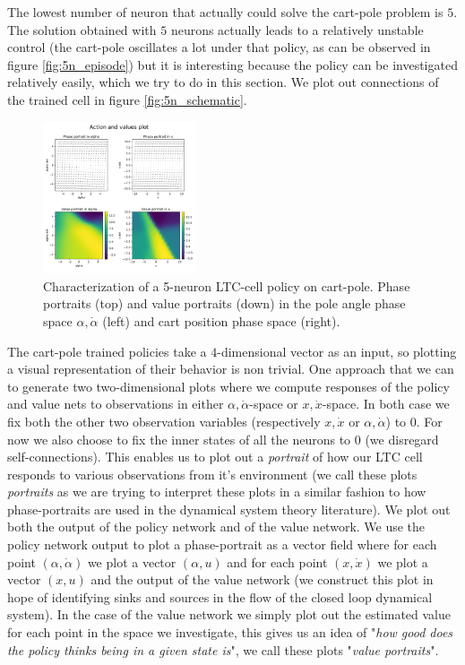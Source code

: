 The lowest number of neuron that actually could solve the cart-pole problem is $5$. The solution obtained with $5$ neurons actually leads to a relatively unstable control (the cart-pole oscillates a lot under that policy, as can be observed in figure \ref{fig:5n_episode}) but it is interesting because the policy can be investigated relatively easily, which we try to do in this section.  We plot out connections of the trained cell in figure \ref{fig:5n_schematic}.\\

\begin{figure}[h!]
    \centering
    \includegraphics[width=0.4\textwidth]{figures/5n_portrait.pdf}
    \caption{Characterization of a 5-neuron LTC-cell policy on cart-pole. Phase portraits (top) and value portraits (down) in the pole angle phase space $\alpha,\dot{\alpha}$ (left) and cart position phase space (right).}
    \label{fig:5n_portrait}
\end{figure}

The cart-pole trained policies take a $4$-dimensional vector as an input, so plotting a visual representation of their behavior is non trivial. One approach that we can to generate two two-dimensional plots where we compute responses of the policy and value nets to observations in either $\alpha,\dot{\alpha}$-space or $x,\dot{x}$-space. 
In both case we fix both the other two observation variables (respectively $x,\dot{x}$ or $\alpha,\dot{\alpha}$) to $0$. For now we also choose to fix the inner states of all the neurons to $0$ (we disregard self-connections). 
This enables us to plot out a \textit{portrait} of how our LTC cell responds to various observations from it's environment (we call these plots \textit{portraits} as we are trying to interpret these plots in a similar fashion to how phase-portraits are used in the dynamical system theory literature). We plot out both the output of the policy network and of the value network. We use the policy network output to plot a phase-portrait as a vector field where for each point $(\alpha,\dot{\alpha})$ we plot a vector $(\alpha,u)$ and for each point $(x,\dot{x})$ we plot a vector $(x,u)$ and the output of the value network (we construct this plot in hope of identifying sinks and sources in the flow of the closed loop dynamical system). In the case of the value network we simply plot out the estimated value for each point in the space we investigate, this gives us an idea of "\textit{how good does the policy thinks being in a given state is}", we call these plots "\textit{value portraits}". \\



